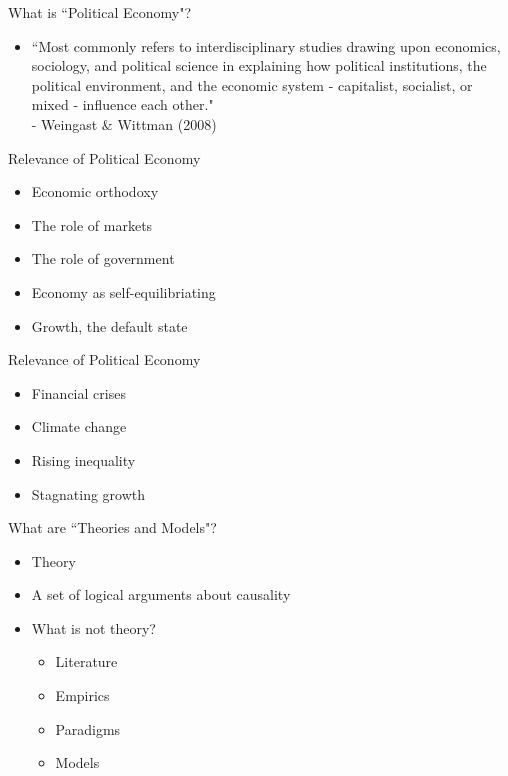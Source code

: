 \documentclass{beamer}
\begin{document}
\begin{frame}{What is ``Political Economy"?}
\begin{itemize}[<+- | alert@+>]
    \item ``Most  commonly refers to interdisciplinary studies drawing upon economics, sociology, and political science in explaining how political institutions, the political environment, and the economic system - capitalist, socialist, or mixed - influence each other."\\
    - Weingast \& Wittman (2008)
\end{itemize}{}
\end{frame}{}

\begin{frame}{Relevance of Political Economy}
\begin{itemize}[<+- | alert@+>]
	\item Economic orthodoxy
	\item The role of markets
	\item The role of government
	\item Economy as self-equilibriating
	\item Growth, the default state
\end{itemize}
\end{frame}

\begin{frame}{Relevance of Political Economy}
\begin{itemize}[<+- | alert@+>]
	\item Financial crises
	\item Climate change
	\item Rising inequality
	\item Stagnating growth
\end{itemize}
\end{frame}

\begin{frame}{What are ``Theories and Models"?}
\begin{itemize}[<+- | alert@+>]
	\item Theory
	\item A set of logical arguments about causality
	\item What is not theory? 
	   \begin{itemize}[<+- | alert@+>]
            \item Literature
            \item Empirics
            \item Paradigms
            \item Models
        \end{itemize}
\end{itemize}
\end{frame}
\end{document}
